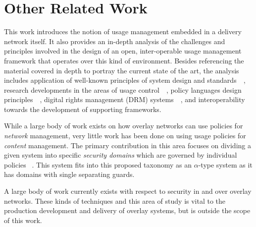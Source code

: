 \section{Other Related Work}
This work introduces the notion of usage management embedded in a delivery network itself.  It also provides an in-depth analysis of the challenges and principles involved in the design of an open, inter-operable usage management framework that operates over this kind of environment. Besides referencing the material covered in depth to portray the current state of the art, the analysis includes application of well-known principles of system design and standards~~\cite{BlCl:01,Cl:88,ClWrSoBr:02}, research developments in the areas of usage control~~\cite{PaSa:04,JaHeLa:10}, policy languages design principles~~\cite{JaHeMa:06}, digital rights management (DRM) systems~~\cite{JaHe:09},  and interoperability~~\cite{JaHe:04,HeJa:05,KoLaMaMi:04,coral,marlin} towards the development of supporting frameworks.

While a large body of work exists on how overlay networks can use policies for \textit{network} management, very little work has been done on using usage policies for \textit{content} management.  The primary contribution in this area focuses on dividing a given system into specific \textit{security domains} which are governed by individual policies ~\cite{4457175}.  This system fits into this proposed taxonomy as an $\alpha$-type system as it has domains with single separating guards.

A large body of work currently exists with respect to security in and over overlay networks.  These kinds of techniques and this area of study is vital to the production development and delivery of overlay systems, but is outside the scope of this work.